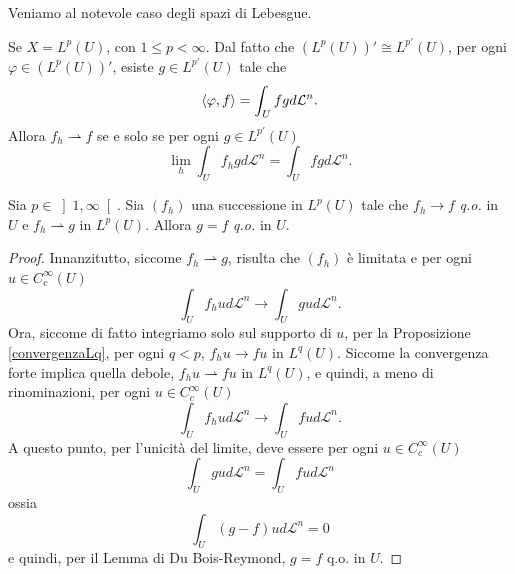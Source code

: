 Veniamo al notevole caso degli spazi di Lebesgue.
\begin{osservazione}
Se $X = L^p(U)$, con $1 \le p < \infty$. Dal fatto che $(L^p(U))'\cong L^{p'}(U)$, per ogni $\varphi \in (L^p(U))'$, esiste $g \in L^{p'}(U)$ tale che 
\[ \braket{\varphi, f} = \int_{U}fgd\mathcal{L}^n. \]
Allora $f_h \rightharpoonup f$ se e solo se per ogni $g \in L^{p'}(U)$
\[ \lim_{h} \int_{U} f_hgd\mathcal{L}^n = \int_{U} fgd\mathcal{L}^n. \]
\end{osservazione}


\begin{proposizione}
Sia $p \in \left]   1,\infty\right[ $. Sia $(f_h)$ una successione in $L^p(U)$ tale che $f_h \to f$ \emph{q.o.} in $U$ e $f_h \rightharpoonup g$ in $L^p(U)$. Allora $g=f$ \emph{q.o.} in $U$.
\end{proposizione}
\begin{proof}
Innanzitutto, siccome $f_h \rightharpoonup g$, risulta che $(f_h)$ è limitata e per ogni $u \in C^\infty_{c}(U)$	
\[ \int_{U}f_h u d\mathcal{L}^n \to \int_U g u d\mathcal{L}^n. \]
Ora, siccome di fatto integriamo solo sul supporto di $u$, per la Proposizione \eqref{convergenzaLq}, per ogni $q < p$, $f_h u \to fu$ in $L^q(U)$. Siccome la convergenza forte implica quella debole, $f_hu \rightharpoonup fu $ in $L^q(U)$, e quindi, a meno di rinominazioni, per ogni $u \in C^\infty_{c}(U)$	
\[ \int_{U}f_h u d\mathcal{L}^n \to \int_U f u d\mathcal{L}^n. \]
A questo punto, per l'unicità del limite, deve essere per ogni $u \in C^\infty_{c}(U)$	
\[ \int_U g u d\mathcal{L}^n = \int_U f u d\mathcal{L}^n \]
ossia
\[ \int_U (g-f) u d\mathcal{L}^n = 0 \]
e quindi, per il Lemma di Du Bois-Reymond, $g = f$ q.o. in $U$.
\end{proof}

